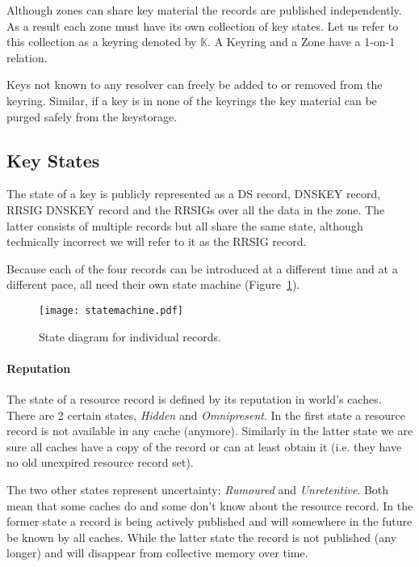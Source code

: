 \documentclass[twoside, a4paper]{article}
\begin{document}
Although zones can share key material the records are published 
independently. As a result each zone must have its own collection of 
key states. Let us refer to this collection as a keyring denoted by 
$\mathbb{K}$. A Keyring and a Zone have a 1-on-1 relation.

Keys not known to any resolver can freely be added to or removed 
from the keyring. Similar, if a key is in none of the keyrings the 
key material can be purged safely from the keystorage.

\subsection{Key States} \label{sec:keystates}

The state of a key is publicly represented as a DS record, DNSKEY 
record, RRSIG DNSKEY record and the RRSIGs over all the data in the 
zone. The latter consists of multiple records but all share the same 
state, although technically incorrect we will refer to it as the 
RRSIG record.

Because each of the four records can be introduced at a different 
time and at a different pace, all need their own state machine 
(Figure~\ref{fig:statemachine}).

\begin{figure}[h]
	\centering
	\texttt{[image: statemachine.pdf]}
	\caption{State diagram for individual records.}
	\label{fig:statemachine}
\end{figure}


\paragraph{Reputation} The state of a resource record is defined by 
its reputation in world's caches. There are 2 certain states, \emph
{Hidden} and \emph {Omnipresent}. In the first state a resource 
record is not available in any cache (anymore). Similarly in the 
latter state we are sure all caches have a copy of the record or can 
at least obtain it (i.e. they have no old unexpired resource record 
set).

The two other states represent uncertainty: \emph{Rumoured} and \emph
{Unretentive}. Both mean that some caches do and some don't know 
about the resource record. In the former state a record is being 
actively published and will somewhere in the future be known by all 
caches. While the latter state the record is not published (any 
longer) and will disappear from collective memory over time.
\end{document}
